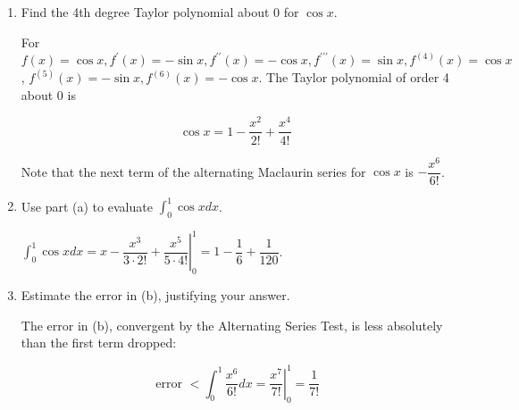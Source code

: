 \question
\begin{enumerate}
\renewcommand{\labelenumi}{(\alph{enumi})}
\item Find the 4th degree Taylor polynomial about 0 for $\cos x$.
\begin{solutionorbox}[1.5in]
For $f(x)=\cos x, f^{\prime}(x)=-\sin x, f^{\prime \prime}(x)=-\cos x, f^{\prime \prime \prime}(x)=\sin x, f^{(4)}(x)=\cos x$, $f^{(5)}(x)=-\sin x, f^{(6)}(x)=-\cos x$. The Taylor polynomial of order 4 about 0 is

\[
\cos x=1-\dfrac{x^{2}}{2!}+\dfrac{x^{4}}{4!}
\]

Note that the next term of the alternating Maclaurin series for $\cos x$ is $-\dfrac{x^{6}}{6!}$.
\end{solutionorbox}

\item Use part (a) to evaluate $\int_{0}^{1} \cos x d x$.
\begin{solutionorbox}[1.5in]
$\int_{0}^{1} \cos x d x=x-\dfrac{x^{3}}{3 \cdot 2!}+\left.\dfrac{x^{5}}{5 \cdot 4!}\right|_{0} ^{1}=1-\dfrac{1}{6}+\dfrac{1}{120}$.
\end{solutionorbox}

\item Estimate the error in (b), justifying your answer.
\begin{solutionorbox}[1.5in]
The error in (b), convergent by the Alternating Series Test, is less absolutely than the first term dropped:

\[
\text { error }<\int_{0}^{1} \dfrac{x^{6}}{6!} d x=\left.\dfrac{x^{7}}{7!}\right|_{0} ^{1}=\dfrac{1}{7!}
\]
\end{solutionorbox}
\end{enumerate}

